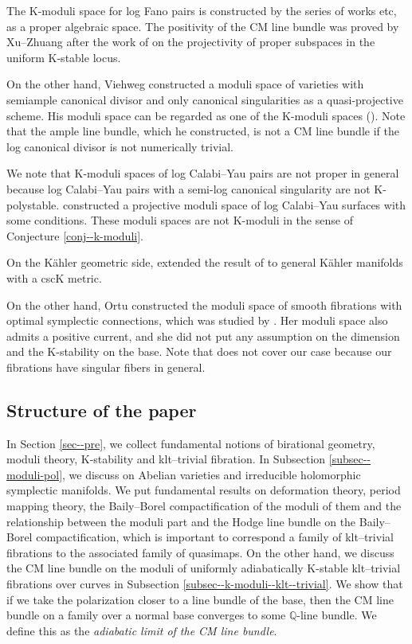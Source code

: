 \documentclass[12pt,twoside]{amsart}
\theoremstyle{definition}
\begin{document}
The K-moduli space for log Fano pairs is constructed by the series of works \cite{BX,BLX,BHLLX,LXZ} etc, as a proper algebraic space.
The positivity of the CM line bundle was proved by Xu--Zhuang \cite{XZ1} after the work of \cite{CP,P} on the projectivity of proper subspaces in the uniform K-stable locus.

On the other hand, Viehweg \cite{viehweg95} constructed a moduli space of varieties with semiample canonical divisor and only canonical singularities as a quasi-projective scheme.
His moduli space can be regarded as one of the K-moduli spaces (\cite[Corollary 3.5]{Hat}).
Note that the ample line bundle, which he constructed, is not a CM line bundle if the log canonical divisor is not numerically trivial.

We note that K-moduli spaces of log Calabi--Yau pairs are not proper in general because log Calabi--Yau pairs with a semi-log canonical singularity are not K-polystable.
\cite{ABB+,BL24} constructed a projective moduli space of log Calabi--Yau surfaces with some conditions.
These moduli spaces are not K-moduli in the sense of Conjecture \ref{conj--k-moduli}.

On the K\"ahler geometric side, \cite{DN} extended the result of \cite{FS} to general K\"ahler manifolds with a cscK metric.

On the other hand, Ortu \cite{Ortb} constructed the moduli space of smooth fibrations with optimal symplectic connections, which was studied by \cite{DS1,DS2,Ort}.
Her moduli space also admits a positive current, and she did not put any assumption on the dimension and the K-stability on the base.
Note that \cite{Ortb} does not cover our case because our fibrations have singular fibers in general.


\subsection{Structure of the paper}
In Section \ref{sec--pre}, we collect fundamental notions of birational geometry, moduli theory, K-stability and klt--trivial fibration.
In Subsection \ref{subsec--moduli-pol}, we discuss on Abelian varieties and irreducible holomorphic symplectic manifolds.
We put fundamental results on deformation theory, period mapping theory, the Baily--Borel compactification of the moduli of them and the relationship between the moduli part and the Hodge line bundle on the Baily--Borel compactification, which is important to correspond a family of klt--trivial fibrations to the associated family of quasimaps.
On the other hand, we discuss the CM line bundle on the moduli of uniformly adiabatically K-stable klt--trivial fibrations over curves in Subsection \ref{subsec--k-moduli--klt--trivial}.
We show that if we take the polarization closer to a line bundle of the base, then the CM line bundle on a family over a normal base converges to some $\mathbb{Q}$-line bundle.
We define this as the {\em adiabatic limit of the CM line bundle}.
\end{document}

